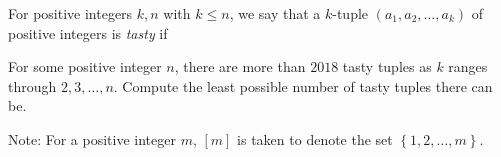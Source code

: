 For positive integers $k,n$ with $k\leq n$, we say that a $k$-tuple $\left(a_1,a_2,\ldots,a_k\right)$ of positive integers is \emph{tasty} if
\begin{itemize}
\end{itemize}
For some positive integer $n$, there are more than $2018$ tasty tuples as $k$ ranges through $2,3,\ldots,n$. Compute the least possible number of tasty tuples there can be.

Note: For a positive integer $m$, $[m]$ is taken to denote the set $\left\{1,2,\ldots,m\right\}$.
